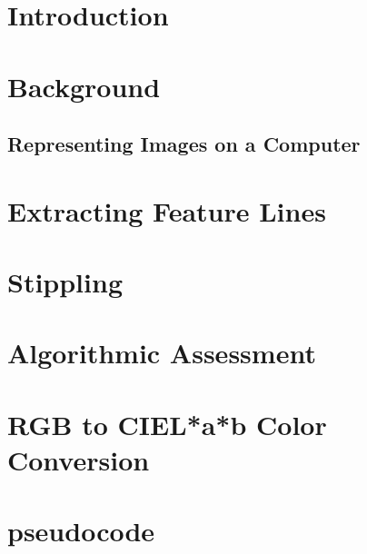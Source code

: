 \documentclass[12pt,twoside]{reedthesis}
\begin{document}

  \mainmatter %
  \pagestyle{fancyplain} %


    \chapter*{Introduction}
\chapter{Background}
\section{Representing Images on a Computer}
\chapter{Extracting Feature Lines}
\chapter{Stippling}
\chapter{Algorithmic Assessment}
\chapter{RGB to CIEL*a*b Color Conversion}
\chapter{pseudocode}
\end{document}
